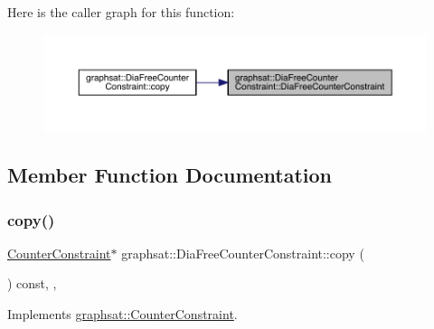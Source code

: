Here is the caller graph for this function\+:
\nopagebreak
\begin{figure}[H]
\begin{center}
\leavevmode
\includegraphics[width=350pt]{classgraphsat_1_1_dia_free_counter_constraint_af0fe74a0aece8727e6eb5733435ce03a_icgraph}
\end{center}
\end{figure}


\subsection{Member Function Documentation}
\mbox{\label{classgraphsat_1_1_dia_free_counter_constraint_a1405e3fcda5895d1a3d274670a43699e}} 
\subsubsection{\texorpdfstring{copy()}{copy()}}
{\footnotesize\ttfamily \mbox{\hyperlink{classgraphsat_1_1_counter_constraint}{Counter\+Constraint}}$\ast$ graphsat\+::\+Dia\+Free\+Counter\+Constraint\+::copy (\begin{DoxyParamCaption}{ }\end{DoxyParamCaption}) const\hspace{0.3cm}{\ttfamily [inline]}, {\ttfamily [private]}, {\ttfamily [virtual]}}



Implements \mbox{\hyperlink{classgraphsat_1_1_counter_constraint_a880eb6520fcf80de35071d62cb31a640}{graphsat\+::\+Counter\+Constraint}}.

